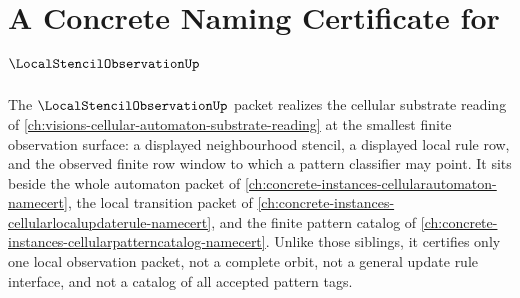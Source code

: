 \chapter{A Concrete Naming Certificate for $\LocalStencilObservationUp$}
\label{ch:concrete-instances-local-stencil-observation-namecert}

The $\LocalStencilObservationUp$ packet realizes the cellular substrate reading of \autoref{ch:visions-cellular-automaton-substrate-reading} at the smallest finite observation surface: a displayed neighbourhood stencil, a displayed local rule row, and the observed finite row window to which a pattern classifier may point. It sits beside the whole automaton packet of \autoref{ch:concrete-instances-cellularautomaton-namecert}, the local transition packet of \autoref{ch:concrete-instances-cellularlocalupdaterule-namecert}, and the finite pattern catalog of \autoref{ch:concrete-instances-cellularpatterncatalog-namecert}. Unlike those siblings, it certifies only one local observation packet, not a complete orbit, not a general update rule interface, and not a catalog of all accepted pattern tags.



